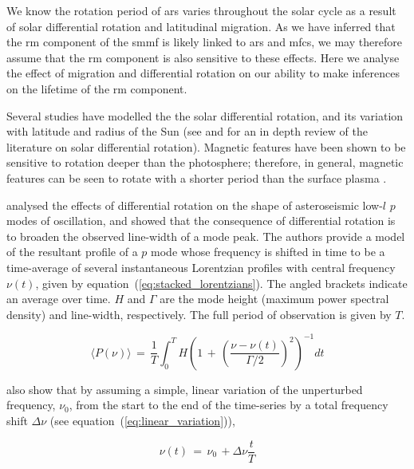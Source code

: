 We know the rotation period of \glspl{ar} varies throughout the solar cycle as a result of solar differential rotation and latitudinal migration. As we have inferred that the \gls{rm} component of the \gls{smmf} is likely linked to \glspl{ar} and \glspl{mfc}, we may therefore assume that the \gls{rm} component is also sensitive to these effects. Here we analyse the effect of migration and differential rotation on our ability to make inferences on the lifetime of the \gls{rm} component.

Several studies have modelled the the solar differential rotation, and its variation with latitude and radius of the Sun (see \citet{beck_comparison_2000} and \cite{howe_solar_2009} for an in depth review of the literature on solar differential rotation). Magnetic features have been shown to be sensitive to rotation deeper than the photosphere; therefore, in general, magnetic features can be seen to rotate with a shorter period than the surface plasma \citep{howe_solar_2009}.

\citet{chaplin_distortion_2008} analysed the effects of differential rotation on the shape of asteroseismic low-$l$ $p$ modes of oscillation, and showed that the consequence of differential rotation is to broaden the observed line-width of a mode peak. The authors provide a model of the resultant profile of a $p$ mode whose frequency is shifted in time to be a time-average of several instantaneous Lorentzian profiles with central frequency $\nu(t)$, given by equation~(\ref{eq:stacked_lorentzians}). The angled brackets indicate an average over time. $H$ and $\Gamma$ are the mode height (maximum power spectral density) and line-width, respectively. The full period of observation is given by $T$.

\begin{equation}
\langle P(\nu) \rangle \, = \, \frac{1}{T} \int^T_0 H \left( 1 \, + \, \left( \frac{\nu - \nu(t)}{\Gamma /2} \right)^2 \right)^{-1} dt
\label{eq:stacked_lorentzians}
\end{equation}

\citet{chaplin_distortion_2008} also show that by assuming a simple, linear variation of the unperturbed frequency, $\nu_0$, from the start to the end of the time-series by a total frequency shift $\Delta\nu$ (see equation~(\ref{eq:linear_variation})),

\begin{equation}
\nu(t) \, = \, \nu_0 \, +  \Delta\nu \frac{t}{T}
\label{eq:linear_variation}
\end{equation}

